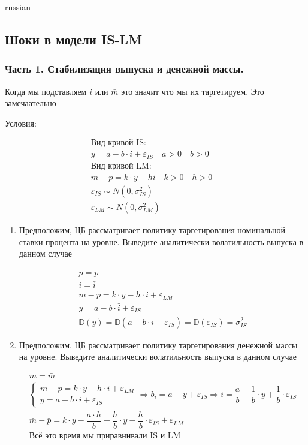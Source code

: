 \documentclass{article}
\begin{document}
\begin{otherlanguage*}{russian}
\subsection*{Шоки в модели IS-LM}
\subsubsection*{Часть 1. Стабилизация выпуска и денежной массы.}
Когда мы подставляем $ \bar{i} $ или $ \bar{m} $ это значит что мы их таргетируем. Это замечаательно

Условия:

\begin{align*}
\text{Вид кривой IS: } \\
y = a - b \cdot i + \varepsilon_{IS} \quad a > 0 \quad b > 0 \\
\text{Вид кривой LM: } \\
m - p = k \cdot y - hi \quad k > 0 \quad h > 0 \quad \\
\varepsilon_{IS} \sim N(0, \sigma^2_{IS} ) \\
\varepsilon_{LM} \sim N(0, \sigma^2_{LM} ) 
\end{align*}
\begin{enumerate}
\item Предположим, ЦБ рассматривает политику таргетирования номинальной ставки процента на
уровне. Выведите аналитически волатильность выпуска в данном случае

\begin{align*}
p = \bar{p} \\
i = \bar{i} \\
m - \bar{p}  = k \cdot y - h \cdot i + \varepsilon_{LM} \\
y = a - b \cdot \bar{i} + \varepsilon_{IS} \\
\mathbb{D} (y) = \mathbb{D} (a - b \cdot \bar{i} + \varepsilon_{IS} ) = \mathbb{D} (\varepsilon_{IS} ) = \sigma^2_{IS} 
\end{align*}
\item Предположим, ЦБ рассматривает политику таргетирования денежной массы на уровне. Выведите аналитически волатильность выпуска в данном случае

\begin{align*}
m = \bar{m} \\
\begin{cases}
\bar{m} - \bar{p} = k \cdot y - h \cdot i + \varepsilon_{LM} \\
y = a - b \cdot i + \varepsilon_{IS} 
\end{cases}\Rightarrow b_i = a - y + \varepsilon_{IS} 
\Rightarrow i = \dfrac{a}{b} - \dfrac{1}{b} \cdot y + \dfrac{1}{b} \cdot \varepsilon_{IS} \\
\bar{m} - \bar{p} = k \cdot y - \dfrac{a \cdot h}{b} + \dfrac{h}{b} \cdot y - \dfrac{h}{b} \cdot \varepsilon_{IS} + \varepsilon_{LM} \\
\text{Всё это время мы приравнивали IS и LM  } 
\end{align*}


\end{enumerate}
\end{otherlanguage*}
\end{document}

